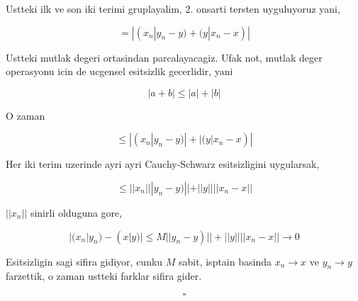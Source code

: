 \documentclass[12pt,fleqn]{article}\usepackage{../common}
\begin{document}
Ustteki ilk ve son iki terimi gruplayalim, 2. onsarti tersten uyguluyoruz
yani, 

\[ = |(x_n|y_n-y) + (y|x_n-x)| \]

Ustteki mutlak degeri ortasindan parcalayacagiz. Ufak not, mutlak deger
operasyonu icin de ucgensel esitsizlik gecerlidir, yani 

\[ |a+b| \le |a| + |b| \]

O zaman 

\[ \le |(x_n|y_n-y)| + |(y|x_n-x)| \]

Her iki terim uzerinde ayri ayri Cauchy-Schwarz esitsizligini uygularsak, 

\[ \le ||x_n|||y_n-y)|| + ||y||||x_n-x|| \]

$||x_n||$ sinirli olduguna gore, 

\[ |(x_n|y_n) - (x|y)| \le M||y_n-y)|| + ||y||||x_n-x|| \to 0 \]

Esitsizligin sagi sifira gidiyor, cunku $M$ sabit, isptain basinda $x_n \to x$
ve $y_n \to y$ farzettik, o zaman ustteki farklar sifira gider. 

\[ \square \]
\end{document}
